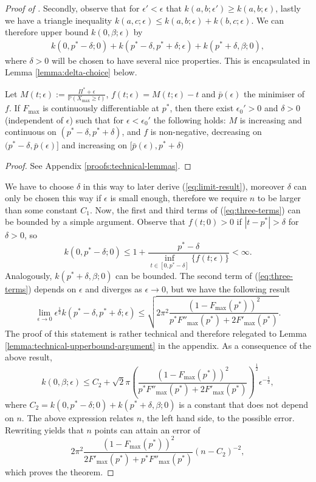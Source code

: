 \documentclass[11pt,a4paper]{article}
\numberwithin{equation}{section}
\newenvironment{cleverproof}[1]
  {\begin{proof}[Proof of \Cref{#1}]}
  {\end{proof}}
\begin{document}
\begin{cleverproof}{lemma:conditional-upperbound}
    Secondly, observe that for $\epsilon'<\epsilon$ that $k(a,b;\epsilon') \ge k(a,b;\epsilon)$, lastly we have a triangle inequality $k(a,c;\epsilon)\le k(a,b;\epsilon) + k(b,c;\epsilon)$. We can therefore upper bound $k(0,\beta;\epsilon)$ by
    \begin{align}
        k(0,p^*-\delta;0)+k(p^*-\delta,p^*+\delta;\epsilon)+k(p^*+\delta,\beta;0),
        \label{eq:three-terms}
    \end{align}
    where $\delta>0$ will be chosen to have several nice properties. This is encapsulated in Lemma \ref{lemma:delta-choice} below.
    \begin{lemma}
        \label{lemma:delta-choice}
        Let $M(t;\epsilon):=\frac{\Pi^*+\epsilon}{\mathbb{P}(X_{\max}\ge t)}$, $f(t;\epsilon)=M(t;\epsilon)-t$ and $\bar{p}(\epsilon)$ the minimiser of $f$. 
        If $F_{\max}$ is continuously differentiable at $p^*$, then there exist $\epsilon_0'>0$ and $\delta>0$ (independent of $\epsilon$) such that for $\epsilon<\epsilon_0'$ the following holds: $M$ is increasing and continuous on $(p^*-\delta,p^*+\delta)$, and $f$ is non-negative, decreasing on $(p^*-\delta,\bar{p}(\epsilon)]$ and increasing on $[\bar{p}(\epsilon),p^*+\delta)$
    \end{lemma}
    \begin{proof}
        See Appendix \ref{proofs:technical-lemmas}.
    \end{proof}
    We have to choose $\delta$ in this way to later derive (\ref{eq:limit-result}), moreover $\delta$ can only be chosen this way if $\epsilon$ is small enough, therefore we require $n$ to be larger than some constant $C_1$. Now, the first and third terms of (\ref{eq:three-terms}) can be bounded by a simple argument. Observe that $f(t;0)>0$ if $|t-p^*|>\delta$ for $\delta>0$, so
    $$
    k(0,p^*-\delta;0)\le 1 + \frac{p^*-\delta}{\inf_{t\in[0,p^*-\delta]}\{f(t;\epsilon)\}}<\infty.
    $$
    Analogously, $k(p^*+\delta,\beta;0)$ can be bounded. 
    The second term of (\ref{eq:three-terms}) depends on $\epsilon$ and diverges as $\epsilon\to 0$, but we have the following result
    \begin{equation}
        \lim_{\epsilon\to 0}\epsilon^{\frac{1}{2}}k(p^*-\delta,p^*+\delta;\epsilon)\le\sqrt{2\pi^2\frac{(1-F_{\max}(p^*))^2}{p^*F''_{\max}(p^*)+2F'_{\max}(p^*)}}. \label{eq:limit-result}
    \end{equation}
    The proof of this statement is rather technical and therefore relegated to Lemma \ref{lemma:technical-upperbound-argument} in the appendix. As a consequence of the above result,
    $$
    k(0,\beta;\epsilon)\le C_2 + \sqrt{2}\pi\left(\frac{(1-F_{\max}(p^*))^2}{p^*F''_{\max}(p^*)+2F'_{\max}(p^*)}\right)^{\frac{1}{2}}\epsilon^{-\frac{1}{2}},
    $$
    where $C_2=k(0,p^*-\delta;0)+k(p^*+\delta,\beta;0)$ is a constant that does not depend on $n$.
    The above expression relates $n$, the left hand side, to the possible error. Rewriting yields that $n$ points can attain an error of
    $$
    2\pi^2\frac{(1-F_{\max}(p^*))^2}{2F'_{\max}(p^*)+p^*F''_{\max}(p^*)}(n-C_2)^{-2},
    $$ 
    which proves the theorem.
\end{cleverproof}
\end{document}
